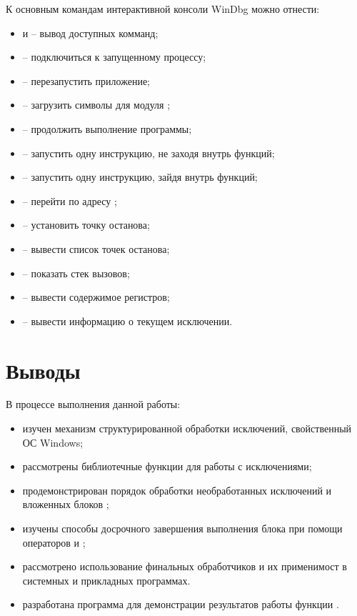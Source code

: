 К основным командам интерактивной консоли WinDbg можно отнести:
\begin{itemize}[itemsep=-0.1cm]
	\item {} и  -- вывод доступных комманд;
	\item {} -- подключиться к запущенному процессу;
	\item {} -- перезапустить приложение;
	\item {} -- загрузить символы для модуля ;
	\item {} -- продолжить выполнение программы;
	\item {} -- запустить одну инструкцию, не заходя внутрь функций;
	\item {} -- запустить одну инструкцию, зайдя внутрь функций;
	\item {} -- перейти по адресу ;
	\item {} -- установить точку останова;
	\item {} -- вывести список точек останова;
	\item {} -- показать стек вызовов;
	\item {} -- вывести содержимое регистров;
	\item {} -- вывести информацию о текущем исключении.
\end{itemize}


\newpage

\section{Выводы}

В процессе выполнения данной работы:

\begin{itemize}
	\item изучен механизм структурированной обработки исключений, свойственный ОС Windows;
	\item рассмотрены библиотечные функции для работы с исключениями;
	\item продемонстрирован порядок обработки необработанных исключений и вложенных блоков ;
	\item изучены способы досрочного завершения выполнения блока  при помощи операторов  и ;
	\item рассмотрено использование финальных обработчиков  и их применимост в системных и прикладных программах.
	\item разработана программа для демонстрации результатов работы функции .
\end{itemize}

